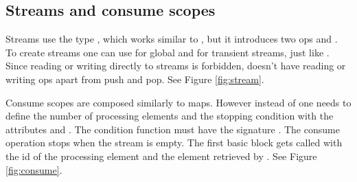 \subsection{Streams and consume scopes} \label{section:stream}
Streams use the type , which works similar to , but it introduces two ops  and . To create streams one can use  for global and  for transient streams, just like . Since reading or writing directly to streams is forbidden,  doesn't have reading or writing ops apart from push and pop. See Figure \ref{fig:stream}.

Consume scopes are composed similarly to maps. However instead of  one needs to define the number of processing elements and the stopping condition with the attributes  and . The condition function must have the signature . The consume operation stops when the stream is empty. The first basic block gets called with the id of the processing element and the element retrieved by . See Figure \ref{fig:consume}.
